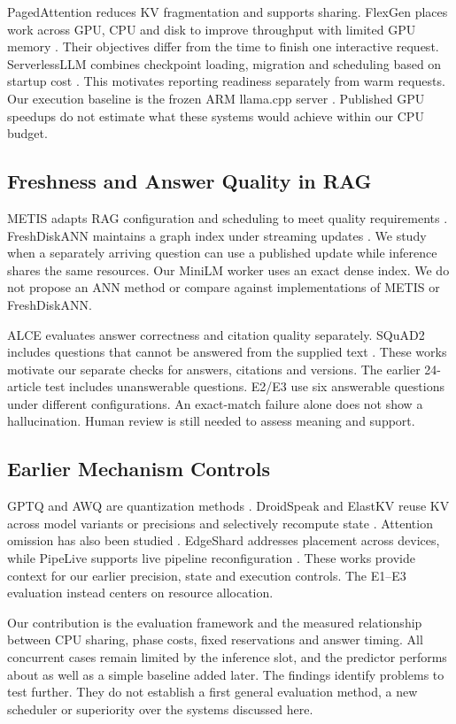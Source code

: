 PagedAttention reduces KV fragmentation and supports sharing. FlexGen places
work across GPU, CPU and disk to improve throughput with limited GPU memory
\citep{pagedattention,flexgen}. Their objectives differ from the time to finish
one interactive request. ServerlessLLM combines checkpoint loading, migration
and scheduling based on startup cost \citep{serverlessllm}. This motivates
reporting readiness separately from warm requests. Our execution baseline is
the frozen ARM llama.cpp server \citep{llamacpp}. Published GPU speedups do
not estimate what these systems would achieve within our CPU budget.

\subsection{Freshness and Answer Quality in RAG}
METIS adapts RAG configuration and scheduling to meet quality requirements
\citep{metis}. FreshDiskANN maintains a graph index under streaming updates
\citep{freshdiskann}. We study when a separately arriving question can use a
published update while inference shares the same resources. Our MiniLM worker
uses an exact dense index. We do not propose an ANN method or compare against
implementations of METIS or FreshDiskANN.

ALCE evaluates answer correctness and citation quality separately. SQuAD2
includes questions that cannot be answered from the supplied text
\citep{alce,squad2}. These works motivate our separate checks for answers,
citations and versions. The earlier 24-article test includes unanswerable
questions. E2/E3 use six answerable questions under different configurations.
An exact-match failure alone does not show a hallucination. Human review is
still needed to assess meaning and support.

\subsection{Earlier Mechanism Controls}
GPTQ and AWQ are quantization methods \citep{gptq,awq}. DroidSpeak and ElastKV
reuse KV across model variants or precisions and selectively recompute state
\citep{droidspeak,elastkv}. Attention omission has also been studied
\citep{attentiondrop}. EdgeShard addresses placement across devices, while
PipeLive supports live pipeline reconfiguration \citep{edgeshard,pipelive}.
These works provide context for our earlier precision, state and execution
controls. The E1--E3 evaluation instead centers on resource allocation.

Our contribution is the evaluation framework and the measured relationship between CPU
sharing, phase costs, fixed reservations and answer timing. All concurrent
cases remain limited by the inference slot, and the predictor performs about
as well as a simple baseline added later. The findings identify problems to
test further. They do not establish a first general evaluation method,
a new scheduler or superiority over the systems discussed here.
